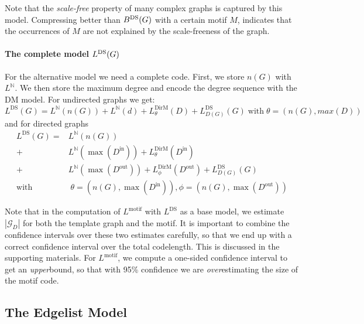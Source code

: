 \documentclass[twoside,11pt]{article}
\newcommand{\cG}{{\mathcal G}}
\newcommand{\N}{{\mathbb N}}
\begin{document}
Note that the \emph{scale-free} property of many complex graphs is captured by this model. Compressing better than $B^\textnormal{DS}(G)$ with a certain motif $M$, indicates that the occurrences of $M$ are not explained by the scale-freeness of the graph.

\paragraph{The complete model $L^\textnormal{DS}(G)$} For the alternative model we need a complete code. First, we store $n(G)$ with $L^\N$. We then store the maximum degree and encode the degree sequence with the DM model. For undirected graphs we get: 
\[
L^\text{DS}(G) = L^\N(n(G)) + L^\N(d) + L^\text{DirM}_{\theta}(D) + L^\text{DS}_{D(G)}(G) \;\text{with}\; \theta = \left(n(G), max(D)\right)
\]
and for directed graphs
\begin{align*}
L^\text{DS}(G) = &L^\N(n(G)) \\ 
 + &L^\N(\max(D^\text{in})) + L^\text{DirM}_{\theta}(D^\text{in})\\
 + &L^\N(\max(D^\text{out})) + L^\text{DirM}_{\phi}(D^\text{out}) + L^\text{DS}_{D(G)}(G) \\
 \text{with}&\; \theta = \left(n(G), \max(D^\text{in})\right), \phi = \left(n(G), \max(D^\text{out})\right) 
\end{align*} 

Note that in the computation of $L^\text{motif}$ with $L^\text{DS}$ as a base model, we estimate $|\cG_D|$ for both the template graph and the motif. It is important to combine the confidence intervals over these two estimates carefully, so that we end up with a correct confidence interval over the total codelength. This is discussed in the supporting materials. For $L^\text{motif}$, we compute a one-sided confidence interval to get an \emph{upper}bound, so that with 95\% confidence we are \emph{over}estimating the size of the motif code. 

\subsection{The Edgelist Model}
\end{document}
